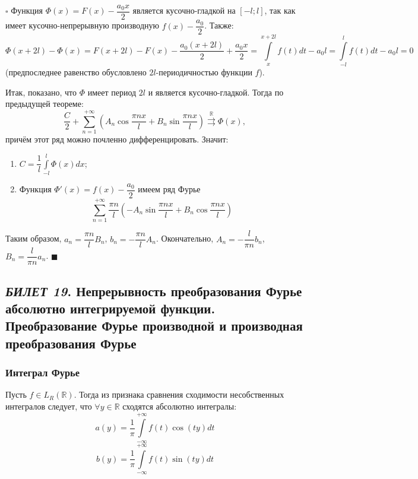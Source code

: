 \documentclass[12pt, a4paper, reqno]{article}
\begin{document}
    $\square$
    Функция $\Phi(x) = F(x) - \dfrac{a_0 x}{2}$ является кусочно-гладкой на $[-l; l]$, так как
    имеет кусочно-непрерывную производную $f(x) - \dfrac{a_0}{2}$. Также:
    \begin{equation*}
        \Phi(x + 2l) - \Phi(x) = F(x + 2l) - F(x) - \frac{a_0(x + 2l)}{2} + \frac{a_0 x}{2} =
        \int\limits_{x}^{x + 2l} f(t)dt - a_0 l = \int\limits_{-l}^{l} f(t)dt - a_0 l = 0
    \end{equation*}
    (предпоследнее равенство обусловлено $2l$-периодичностью функции $f$).

    Итак, показано, что $\Phi$ имеет период $2l$ и является кусочно-гладкой. Тогда по предыдущей
    теореме:
    \begin{equation*}
        \frac{C}{2} + \sum\limits_{n = 1}^{+\infty}
        \left(
            A_n \cos{\frac{\pi nx}{l}} + B_n \sin{\frac{\pi nx}{l}}
        \right)
        \overset{\mathbb{R}}{\rightrightarrows} \Phi(x),
    \end{equation*}
    причём этот ряд можно почленно дифференцировать. Значит:
    \begin{enumerate}
        \item $C = \dfrac{1}{l}\int\limits_{-l}^{l}\Phi(x)dx$;
        \item Функция $\Phi'(x) = f(x) - \dfrac{a_0}{2}$ имеем ряд Фурье
        \begin{equation*}
            \sum\limits_{n = 1}^{+\infty} \frac{\pi n}{l}
            \left(
                -A_n \sin{\frac{\pi nx}{l}} + B_n \cos{\frac{\pi nx}{l}}
            \right)
        \end{equation*}
    \end{enumerate}
    Таким образом, $a_n = \dfrac{\pi n}{l}B_n$, $b_n = -\dfrac{\pi n}{l}A_n$. Окончательно,
    $A_n = -\dfrac{l}{\pi n}b_n$, $B_n = \dfrac{l}{\pi n}a_n$.
    $\blacksquare$

\newpage
\subsection{\textit{БИЛЕТ 19}. Непрерывность преобразования Фурье абсолютно интегрируемой функции.
            Преобразование Фурье производной и производная преобразования Фурье}

    \subsubsection{Интеграл Фурье}

    Пусть $f \in L_R(\mathbb{R})$. Тогда из признака сравнения сходимости несобственных интегралов
    следует, что $\forall y \in \mathbb{R}$ сходятся абсолютно интегралы:
    \begin{equation*}
        a(y) = \frac{1}{\pi}\int\limits_{-\infty}^{+\infty} f(t)\cos{(ty)}dt
    \end{equation*}
    \begin{equation*}
        b(y) = \frac{1}{\pi}\int\limits_{-\infty}^{+\infty} f(t)\sin{(ty)}dt
    \end{equation*}
\end{document}

